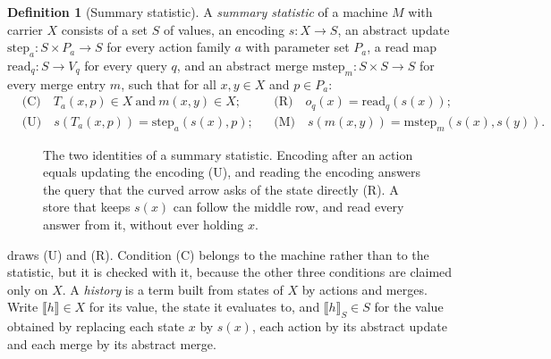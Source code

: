 \documentclass[11pt]{article}
\newcommand{\step}{\mathrm{step}}
\newcommand{\rd}{\mathrm{read}}
\newcommand{\mstep}{\mathrm{mstep}}
\theoremstyle{definition}
\newtheorem{definition}{Definition}[section]
\theoremstyle{plain}
\begin{document}
\begin{definition}[Summary statistic]\label{def:stat}
A \emph{summary statistic} of a machine $M$ with carrier $X$ consists of a set $S$ of values, an
encoding $s\colon X\to S$, an abstract update $\step_a\colon S\times P_a\to S$ for every action
family $a$ with parameter set $P_a$, a read map $\rd_q\colon S\to V_q$ for every query $q$, and an
abstract merge $\mstep_m\colon S\times S\to S$ for every merge entry $m$, such that for all
$x,y\in X$ and $p\in P_a$:
\begin{align*}
&\text{(C)}\quad T_a(x,p)\in X\ \text{and}\ m(x,y)\in X; &
&\text{(R)}\quad o_q(x)=\rd_q(s(x));\\
&\text{(U)}\quad s(T_a(x,p))=\step_a(s(x),p); &
&\text{(M)}\quad s(m(x,y))=\mstep_m(s(x),s(y)).
\end{align*}
\end{definition}

\begin{figure}[ht]
\centering
{}
\caption{The two identities of a summary statistic. Encoding after an action equals updating the
encoding (U), and reading the encoding answers the query that the curved arrow asks of the state
directly (R). A store that keeps $s(x)$ can follow the middle row, and read every answer from it,
without ever holding $x$.}\label{fig:square}
\end{figure}

 draws (U) and (R). Condition (C) belongs to the machine rather than to the
statistic, but it is checked with it, because the other three conditions are claimed only on $X$. A
\emph{history} is a term built from states of $X$ by actions and merges. Write $\llbracket
h\rrbracket\in X$ for its value, the state it evaluates to, and $\llbracket h\rrbracket_S\in S$ for
the value obtained by replacing each state $x$ by $s(x)$, each action by its abstract update and
each merge by its abstract merge.
\end{document}

